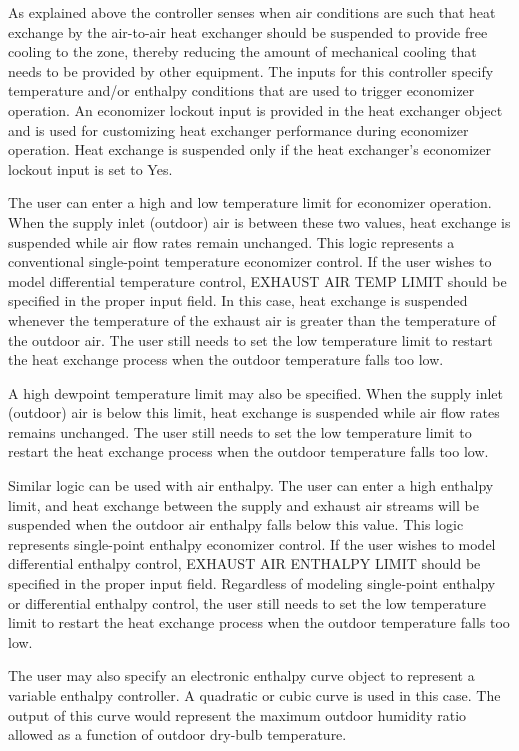 As explained above the controller senses when air conditions are such that heat exchange by the air-to-air heat exchanger should be suspended to provide free cooling to the zone, thereby reducing the amount of mechanical cooling that needs to be provided by other equipment. The inputs for this controller specify temperature and/or enthalpy conditions that are used to trigger economizer operation. An economizer lockout input is provided in the heat exchanger object and is used for customizing heat exchanger performance during economizer operation. Heat exchange is suspended only if the heat exchanger's economizer lockout input is set to Yes.

The user can enter a high and low temperature limit for economizer operation. When the supply inlet (outdoor) air is between these two values, heat exchange is suspended while air flow rates remain unchanged. This logic represents a conventional single-point temperature economizer control. If the user wishes to model differential temperature control, EXHAUST AIR TEMP LIMIT should be specified in the proper input field. In this case, heat exchange is suspended whenever the temperature of the exhaust air is greater than the temperature of the outdoor air. The user still needs to set the low temperature limit to restart the heat exchange process when the outdoor temperature falls too low.

A high dewpoint temperature limit may also be specified. When the supply inlet (outdoor) air is below this limit, heat exchange is suspended while air flow rates remains unchanged. The user still needs to set the low temperature limit to restart the heat exchange process when the outdoor temperature falls too low.

Similar logic can be used with air enthalpy. The user can enter a high enthalpy limit, and heat exchange between the supply and exhaust air streams will be suspended when the outdoor air enthalpy falls below this value. This logic represents single-point enthalpy economizer control. If the user wishes to model differential enthalpy control, EXHAUST AIR ENTHALPY LIMIT should be specified in the proper input field. Regardless of modeling single-point enthalpy or differential enthalpy control, the user still needs to set the low temperature limit to restart the heat exchange process when the outdoor temperature falls too low.

The user may also specify an electronic enthalpy curve object to represent a variable enthalpy controller. A quadratic or cubic curve is used in this case. The output of this curve would represent the maximum outdoor humidity ratio allowed as a function of outdoor dry-bulb temperature.

